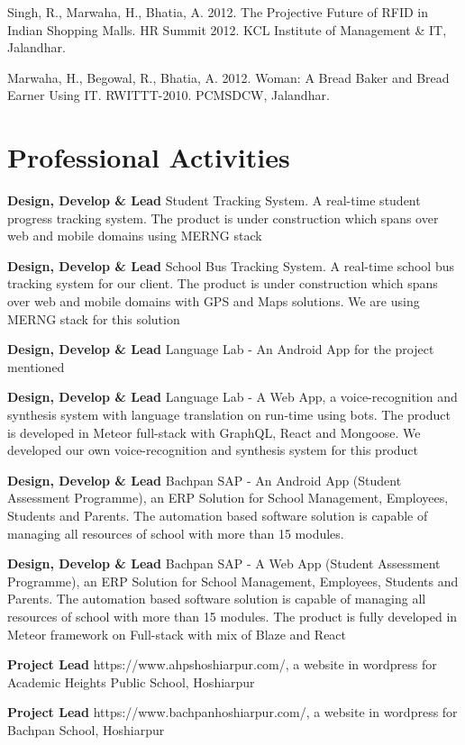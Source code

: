 \documentclass[margin,line]{res}
\begin{document}
\begin{resume}
Singh, R., Marwaha, H., Bhatia, A. 2012. The Projective Future of RFID in Indian Shopping Malls. HR Summit 2012. KCL Institute of Management \& IT, Jalandhar. 

Marwaha, H., Begowal, R., Bhatia, A. 2012. Woman: A Bread Baker and Bread Earner Using IT. RWITTT-2010. PCMSDCW, Jalandhar.

\section{\sc Professional Activities}

\textbf{Design, Develop \& Lead} Student Tracking System. A real-time student progress tracking system. The product is under construction which spans over web and mobile domains using MERNG stack

\textbf{Design, Develop \& Lead} School Bus Tracking System. A real-time school bus tracking system for our client. The product is under construction which spans over web and mobile domains with GPS and Maps solutions. We are using MERNG stack for this solution

\textbf{Design, Develop \& Lead} Language Lab - An Android App for the project mentioned

\textbf{Design, Develop \& Lead} Language Lab - A Web App, a voice-recognition and synthesis system with language translation on run-time using bots. The product is developed in Meteor full-stack with GraphQL, React and Mongoose. We developed our own voice-recognition and synthesis system for this product

\textbf{Design, Develop \& Lead} Bachpan SAP - An Android App (Student Assessment Programme), an ERP Solution for School Management, Employees, Students and Parents. The automation based software solution is capable of managing all resources of school with more than 15 modules.

\textbf{Design, Develop \& Lead} Bachpan SAP - A Web App (Student Assessment Programme), an ERP Solution for School Management, Employees, Students and Parents. The automation based software solution is capable of managing all resources of school with more than 15 modules. The product is fully developed in Meteor framework on Full-stack with mix of Blaze and React

\textbf{Project Lead} https://www.ahpshoshiarpur.com/, a website in wordpress for Academic Heights Public School, Hoshiarpur

\textbf{Project Lead} https://www.bachpanhoshiarpur.com/, a website in wordpress for Bachpan School, Hoshiarpur


\end{resume}
\end{document}
